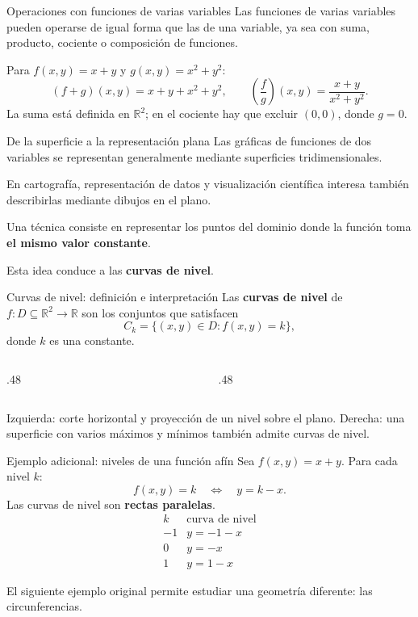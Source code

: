 \documentclass[main.tex]{subfiles}
\begin{document}
\begin{frame}{Operaciones con funciones de varias variables}
Las funciones de varias variables pueden operarse de igual forma que las de una variable, ya sea con suma, producto, cociente o composición de funciones.
\medskip

Para $f(x,y)=x+y$ y $g(x,y)=x^2+y^2$:
\[
(f+g)(x,y)=x+y+x^2+y^2,
\qquad
\left(\frac fg\right)(x,y)=\frac{x+y}{x^2+y^2}.
\]
La suma está definida en $\mathbb R^2$;
en el cociente hay que excluir $(0,0)$, donde $g=0$.
\end{frame}
\begin{frame}{De la superficie a la representación plana}
Las gráficas de funciones de dos variables se representan generalmente mediante superficies tridimensionales.
\medskip

En cartografía, representación de datos y visualización científica
interesa también describirlas mediante dibujos en el plano.
\medskip

Una técnica consiste en representar los puntos del dominio donde la función toma \textbf{el mismo valor constante}.
\medskip

Esta idea conduce a las \textbf{curvas de nivel}.
\end{frame}

\begin{frame}{Curvas de nivel: definición e interpretación}
Las \textbf{curvas de nivel} de $f:D\subseteq\mathbb R^2\to\mathbb R$ son los conjuntos que satisfacen
\[
C_k=\{(x,y)\in D:f(x,y)=k\},
\]
donde $k$ es una constante.
\vspace{-1mm}
\begin{columns}[c]
\begin{column}{.48\textwidth}
\end{column}
\begin{column}{.48\textwidth}
\end{column}
\end{columns}
\vspace{-3mm}
\small Izquierda: corte horizontal y proyección de un nivel sobre el plano. Derecha: una superficie con varios máximos y mínimos también admite curvas de nivel.
\end{frame}
\begin{frame}{Ejemplo adicional: niveles de una función afín}
Sea $f(x,y)=x+y$. Para cada nivel $k$:
\[
f(x,y)=k\quad\Longleftrightarrow\quad y=k-x.
\]
Las curvas de nivel son \textbf{rectas paralelas}.
\[
\begin{array}{c|c}
k & \text{curva de nivel}\\\hline
-1 & y=-1-x\\
0 & y=-x\\
1 & y=1-x
\end{array}
\]
\medskip

El siguiente ejemplo original permite estudiar una geometría diferente: las circunferencias.
\end{frame}
\end{document}
